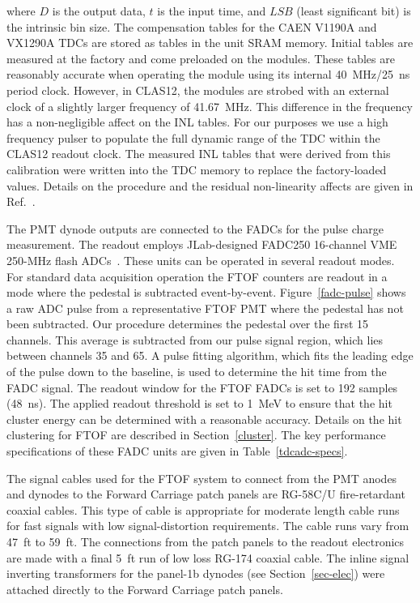 \documentclass{elsart}
\begin{document}
\noindent
where $D$ is the output data, $t$ is the input time, and $LSB$ (least significant bit) is the intrinsic bin
size. The compensation tables for the CAEN V1190A and VX1290A TDCs are stored as tables in the unit
SRAM memory. Initial tables are measured at the factory and come preloaded on the modules. These
tables are reasonably accurate when operating the module using its internal 40~MHz/25~ns period clock.
However, in CLAS12, the modules are strobed with an external clock of a slightly larger frequency of
41.67~MHz. This difference in the frequency has a non-negligible affect on the INL tables. For our
purposes we use a high frequency pulser to populate the full dynamic range of the TDC within the CLAS12
readout clock. The measured INL tables that were derived from this calibration were written into the
TDC memory to replace the factory-loaded values. Details on the procedure and the residual non-linearity
affects are given in Ref.~\cite{inl-tables}.

The PMT dynode outputs are connected to the FADCs for the pulse charge measurement. The readout
employs JLab-designed FADC250 16-channel VME 250-MHz flash ADCs~\cite{fadc-manual}. These units
can be operated in several readout modes. For standard data acquisition operation the FTOF counters are
readout in a mode where the pedestal is subtracted event-by-event. Figure~\ref{fadc-pulse} shows a raw
ADC pulse from a representative FTOF PMT where the pedestal has not been subtracted. Our procedure
determines the pedestal over the first 15 channels. This average is subtracted from our pulse signal region,
which lies between channels 35 and 65. A pulse fitting algorithm, which fits the leading edge of the pulse
down to the baseline, is used to determine the hit time from the FADC signal. The readout window for the
FTOF FADCs is set to 192 samples (48~ns). The applied readout threshold is set to 1~MeV to ensure that
the hit cluster energy can be determined with a reasonable accuracy. Details on the hit clustering for FTOF
are described in Section~\ref{cluster}. The key performance specifications of these FADC units are given
in Table~\ref{tdcadc-specs}.

The signal cables used for the FTOF system to connect from the PMT anodes and dynodes to the Forward
Carriage patch panels are RG-58C/U fire-retardant coaxial cables. This type of cable is appropriate for
moderate length cable runs for fast signals with low signal-distortion requirements. The cable runs vary
from 47~ft to 59~ft. The connections from the patch panels to the readout electronics are made with a
final 5~ft run of low loss RG-174 coaxial cable. The inline signal inverting transformers for the panel-1b
dynodes (see Section~\ref{sec-elec}) were attached directly to the Forward Carriage patch panels.
\end{document}
